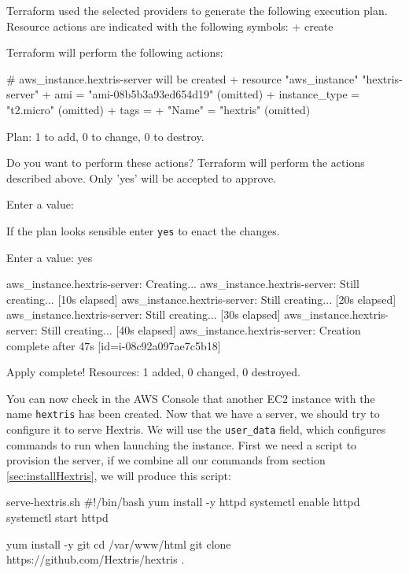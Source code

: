 \documentclass{csse4400}
\begin{document}
\begin{code}[numbers=none]{}
Terraform used the selected providers to generate the following execution plan. Resource actions are indicated with the following symbols:
  + create

Terraform will perform the following actions:

  # aws_instance.hextris-server will be created
  + resource "aws_instance" "hextris-server" {
      + ami                                  = "ami-08b5b3a93ed654d19"
      (omitted)
      + instance_type                        = "t2.micro"
      (omitted)
      + tags                                 = {
          + "Name" = "hextris"
        }
      (omitted)
    }

Plan: 1 to add, 0 to change, 0 to destroy.

Do you want to perform these actions?
  Terraform will perform the actions described above.
  Only 'yes' will be accepted to approve.

  Enter a value: 
\end{code}

If the plan looks sensible enter \texttt{yes} to enact the changes.

\begin{code}[numbers=none]{}
  Enter a value: yes

aws_instance.hextris-server: Creating...
aws_instance.hextris-server: Still creating... [10s elapsed]
aws_instance.hextris-server: Still creating... [20s elapsed]
aws_instance.hextris-server: Still creating... [30s elapsed]
aws_instance.hextris-server: Still creating... [40s elapsed]
aws_instance.hextris-server: Creation complete after 47s [id=i-08c92a097ae7c5b18]

Apply complete! Resources: 1 added, 0 changed, 0 destroyed.
\end{code}

You can now check in the AWS Console that another EC2 instance with the name \texttt{hextris} has been created.
Now that we have a server, we should try to configure it to serve Hextris.
We will use the \texttt{user\_data} field, which configures commands to run when launching the instance.
First we need a script to provision the server, if we combine all our commands from section \ref{sec:installHextris}, we will produce this script:

\begin{code}[language=bash,numbers=none]{serve-hextris.sh}
#!/bin/bash
yum install -y httpd
systemctl enable httpd
systemctl start httpd

yum install -y git
cd /var/www/html
git clone https://github.com/Hextris/hextris .  
\end{code}
\end{document}
